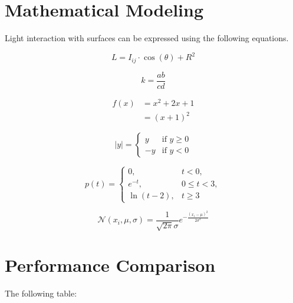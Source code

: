 \documentclass[11pt]{article}
\begin{document}
\clearpage  %

\section{Mathematical Modeling}
Light interaction with surfaces can be expressed using the following equations.

\begin{equation}
    L = I_{ij} \cdot \cos(\theta) + R^{2}
\end{equation}

\begin{equation}
    k = \frac{ab}{cd}
\end{equation}

\begin{equation}
\begin{split}
    f(x) & = x^{2} + 2x + 1 \\
         & = (x+1)^{2}
\end{split}
\end{equation}

\begin{equation}
    |y| = \begin{cases} 
        y & \text{if } y \ge 0 \\
        -y & \text{if } y < 0 
    \end{cases}
\end{equation}

\begin{equation}
    p(t) = \begin{cases} 
        0, & t < 0, \\
        e^{-t}, & 0 \le t < 3, \\
        \ln(t-2), & t \ge 3
    \end{cases}
\end{equation}

\begin{equation}
    \mathcal{N}(x_{i},\mu,\sigma) = \frac{1}{\sqrt{2\pi}\sigma}e^{-\frac{(x_{i}-\mu)^{2}}{2\sigma^{2}}}
\end{equation}

\section{Performance Comparison}

The following table:
\end{document}
